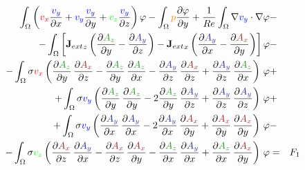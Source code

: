 \documentclass[smallextended]{svjour3}       %
\begin{document}
\begin{eqnarray}
			\int_{\Omega} \left(\textcolor{red}{v_x} \frac{\textcolor{blu}{v_y}}{\partial x} + \textcolor{blu}{v_y} \frac{\textcolor{blu}{v_y}}{\partial y} + \textcolor{gre}{v_z} \frac{\textcolor{blu}{v_y}}{\partial z}\right) \varphi
			- \int_{\Omega} \textcolor{orange}{p} \frac{\partial \varphi}{\partial y}
			+ \frac{1}{Re} \int_{\Omega} \nabla \textcolor{blu}{v_y} \cdot \nabla \varphi
			\nonumber & -\\
			- \int_{\Omega} \left[{\mathbf{J}_{ext}}_z \left(\frac{\partial \textcolor{darkgre}{A_z}}{\partial y} - \frac{\partial \textcolor{darkblu}{A_y}}{\partial z}\right) - {\mathbf{J}_{ext}}_x \left(\frac{\partial \textcolor{darkblu}{A_y}}{\partial x} - \frac{\partial \textcolor{darkred}{A_x}}{\partial y}\right)\right] \varphi			
			\nonumber & -\\
			- \int_{\Omega} \sigma \textcolor{red}{v_x} \left(\frac{\partial \textcolor{darkgre}{A_z}}{\partial y}\,\frac{\partial \textcolor{darkred}{A_x}}{\partial z} - \frac{\partial \textcolor{darkgre}{A_z}}{\partial y}\,\frac{\partial \textcolor{darkgre}{A_z}}{\partial x} - \frac{\partial \textcolor{darkblu}{A_y}}{\partial z}\,\frac{\partial \textcolor{darkred}{A_x}}{\partial z}  + \frac{\partial \textcolor{darkblu}{A_y}}{\partial z}\,\frac{\partial \textcolor{darkgre}{A_z}}{\partial x} \right)\, \varphi& +\nonumber \\			
			+ \int_{\Omega} \sigma \textcolor{blu}{v_y} \left(\frac{\partial \textcolor{darkgre}{A_z}}{\partial y}\,\frac{\partial \textcolor{darkgre}{A_z}}{\partial y} - 2 \frac{\partial \textcolor{darkgre}{A_z}}{\partial y}\,\frac{\partial \textcolor{darkblu}{A_y}}{\partial z} + \frac{\partial \textcolor{darkblu}{A_y}}{\partial z}\,\frac{\partial \textcolor{darkblu}{A_y}}{\partial z} \right)\, \varphi& +\nonumber \\			
			+ \int_{\Omega} \sigma \textcolor{blu}{v_y} \left(\frac{\partial \textcolor{darkblu}{A_y}}{\partial x}\,\frac{\partial \textcolor{darkblu}{A_y}}{\partial x} - 2 \frac{\partial \textcolor{darkblu}{A_y}}{\partial x}\,\frac{\partial \textcolor{darkred}{A_x}}{\partial y} + \frac{\partial \textcolor{darkred}{A_x}}{\partial y}\,\frac{\partial \textcolor{darkred}{A_x}}{\partial y} \right)\, \varphi& -\nonumber \\			
			- \int_{\Omega} \sigma \textcolor{gre}{v_z} \left(\frac{\partial \textcolor{darkred}{A_x}}{\partial z}\,\frac{\partial \textcolor{darkblu}{A_y}}{\partial x} - \frac{\partial \textcolor{darkred}{A_x}}{\partial z}\,\frac{\partial \textcolor{darkred}{A_x}}{\partial y} - \frac{\partial \textcolor{darkgre}{A_z}}{\partial x}\,\frac{\partial \textcolor{darkblu}{A_y}}{\partial x}  + \frac{\partial \textcolor{darkgre}{A_z}}{\partial x}\,\frac{\partial \textcolor{darkred}{A_x}}{\partial y} \right)\, \varphi& = & F_1\\			

\end{eqnarray}
\end{document}
